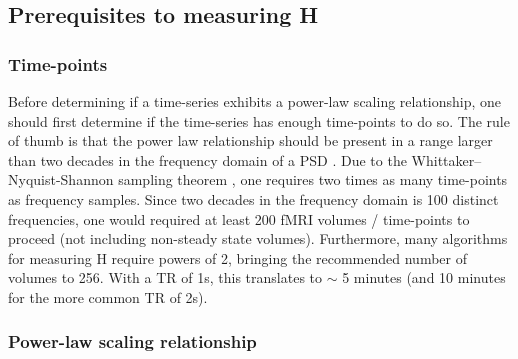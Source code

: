 \documentclass[
  sn-vancouver,
  Numbered,
  referee,
  lineno]{sn-jnl}
\begin{document}
\subsection{Prerequisites to measuring
H}\label{prerequisites-to-measuring-h}

\subsubsection{Time-points}\label{time-points}

Before determining if a time-series exhibits a power-law scaling
relationship, one should first determine if the time-series has enough
time-points to do so. The rule of thumb is that the power law
relationship should be present in a range larger than two decades in the
frequency domain of a PSD \citep{ekePhysiologicalTimeSeries2000}. Due to
the Whittaker--Nyquist-Shannon sampling theorem
\citep{shannonCommunicationPresenceNoise1949}, one requires two times as
many time-points as frequency samples. Since two decades in the
frequency domain is 100 distinct frequencies, one would required at
least 200 fMRI volumes / time-points to proceed (not including
non-steady state volumes). Furthermore, many algorithms for measuring H
require powers of 2, bringing the recommended number of volumes to 256.
With a TR of 1s, this translates to \(\sim\) 5 minutes (and 10 minutes
for the more common TR of 2s).

\subsubsection{Power-law scaling
relationship}\label{power-law-scaling-relationship-1}
\end{document}
